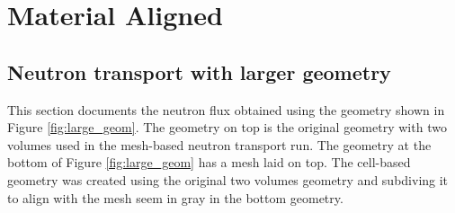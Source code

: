 \section{Material Aligned}\label{sec:mat_aligned}

\subsection{Neutron transport with larger geometry}
This section documents the neutron flux obtained using the geometry shown 
in Figure \ref{fig:large_geom}.
The geometry on top is the original geometry with two volumes used in the 
mesh-based neutron transport run. 
The geometry at the bottom of Figure \ref{fig:large_geom} has a mesh laid 
on top. The cell-based geometry was created using the original two volumes
geometry and subdiving it to align with the mesh seem in gray in the bottom 
geometry. 

